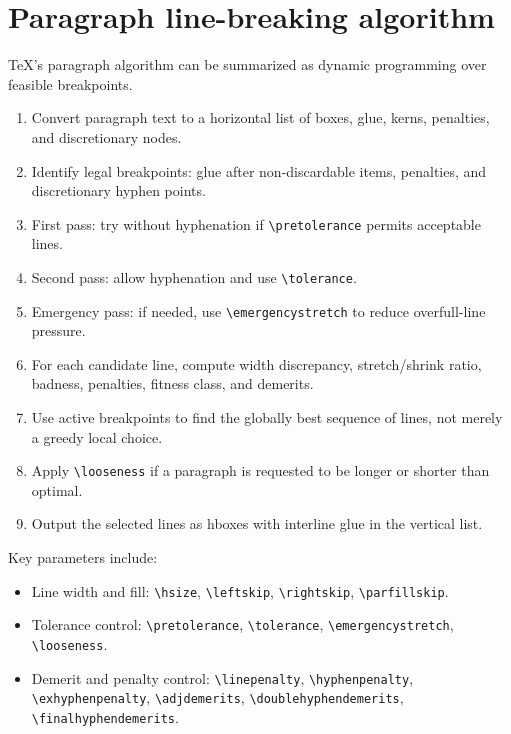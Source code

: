 \documentclass[11pt]{article}
\newcommand{\tightlist}{}
\begin{document}
\section{Paragraph line-breaking algorithm}\label{paragraph-line-breaking-algorithm}

TeX's paragraph algorithm can be summarized as dynamic programming over feasible breakpoints.

\begin{enumerate}
\def\labelenumi{\arabic{enumi}.}
\tightlist
\item
  Convert paragraph text to a horizontal list of boxes, glue, kerns, penalties, and discretionary nodes.
\item
  Identify legal breakpoints: glue after non-discardable items, penalties, and discretionary hyphen points.
\item
  First pass: try without hyphenation if \texttt{\textbackslash{}pretolerance} permits acceptable lines.
\item
  Second pass: allow hyphenation and use \texttt{\textbackslash{}tolerance}.
\item
  Emergency pass: if needed, use \texttt{\textbackslash{}emergencystretch} to reduce overfull-line pressure.
\item
  For each candidate line, compute width discrepancy, stretch/shrink ratio, badness, penalties, fitness class, and demerits.
\item
  Use active breakpoints to find the globally best sequence of lines, not merely a greedy local choice.
\item
  Apply \texttt{\textbackslash{}looseness} if a paragraph is requested to be longer or shorter than optimal.
\item
  Output the selected lines as hboxes with interline glue in the vertical list.
\end{enumerate}

Key parameters include:
\begin{itemize}
\item Line width and fill: \texttt{\textbackslash{}hsize}, \texttt{\textbackslash{}leftskip}, \texttt{\textbackslash{}rightskip}, \texttt{\textbackslash{}parfillskip}.
\item Tolerance control: \texttt{\textbackslash{}pretolerance}, \texttt{\textbackslash{}tolerance}, \texttt{\textbackslash{}emergencystretch}, \texttt{\textbackslash{}looseness}.
\item Demerit and penalty control: \texttt{\textbackslash{}linepenalty}, \texttt{\textbackslash{}hyphenpenalty}, \texttt{\textbackslash{}exhyphenpenalty}, \texttt{\textbackslash{}adjdemerits}, \texttt{\textbackslash{}doublehyphendemerits}, \texttt{\textbackslash{}finalhyphendemerits}.
\end{itemize}
\end{document}
